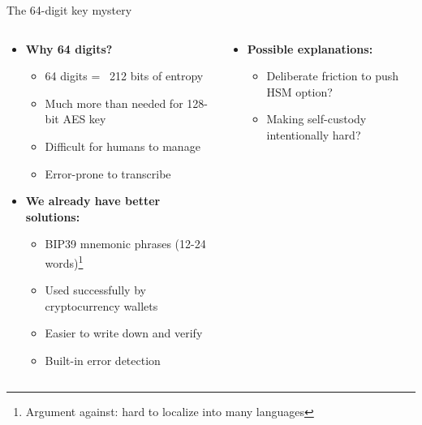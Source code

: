 \documentclass[aspectratio=169, lualatex, handout]{beamer}
\begin{document}
\begin{frame}{The 64-digit key mystery}
	\begin{columns}[c]
		\begin{column}{0.5\textwidth}
			\begin{itemize}
				\item \textbf{Why 64 digits?}
				      \begin{itemize}
					      \item 64 digits = ~212 bits of entropy
					      \item Much more than needed for 128-bit AES key
					      \item Difficult for humans to manage
					      \item Error-prone to transcribe
				      \end{itemize}
				\item \textbf{We already have better solutions:}
				      \begin{itemize}
					      \item BIP39 mnemonic phrases (12-24 words)\footnote{Argument against: hard to localize into many languages}
					      \item Used successfully by cryptocurrency wallets
					      \item Easier to write down and verify
					      \item Built-in error detection
				      \end{itemize}
			\end{itemize}
		\end{column}
		\begin{column}{0.5\textwidth}
			\begin{itemize}
				\item \textbf{Possible explanations:}
				      \begin{itemize}
					      \item Deliberate friction to push HSM option?
					      \item Making self-custody intentionally hard?
				      \end{itemize}
			\end{itemize}
		\end{column}
	\end{columns}
\end{frame}
\end{document}
